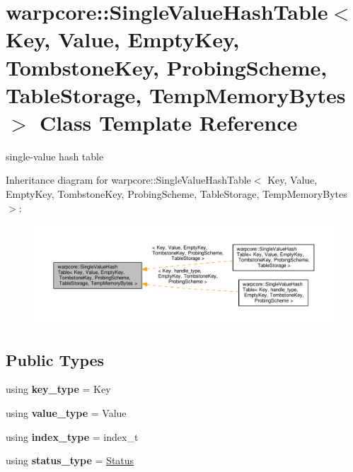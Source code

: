 \hypertarget{classwarpcore_1_1SingleValueHashTable}{}\section{warpcore\+:\+:Single\+Value\+Hash\+Table$<$ Key, Value, Empty\+Key, Tombstone\+Key, Probing\+Scheme, Table\+Storage, Temp\+Memory\+Bytes $>$ Class Template Reference}
\label{classwarpcore_1_1SingleValueHashTable}


single-\/value hash table  




Inheritance diagram for warpcore\+:\+:Single\+Value\+Hash\+Table$<$ Key, Value, Empty\+Key, Tombstone\+Key, Probing\+Scheme, Table\+Storage, Temp\+Memory\+Bytes $>$\+:
\nopagebreak
\begin{figure}[H]
\begin{center}
\leavevmode
\includegraphics[width=350pt]{classwarpcore_1_1SingleValueHashTable__inherit__graph}
\end{center}
\end{figure}
\subsection*{Public Types}
\begin{DoxyCompactItemize}
\item 
\mbox{\label{classwarpcore_1_1SingleValueHashTable_a7addf5255239ce3ceb7a14b5d327b727}} 
using {\bfseries key\+\_\+type} = Key
\item 
\mbox{\label{classwarpcore_1_1SingleValueHashTable_a73cd0226945becb4f8dd655d6e4d2102}} 
using {\bfseries value\+\_\+type} = Value
\item 
\mbox{\label{classwarpcore_1_1SingleValueHashTable_a998bad3c1c2f705752f9108e2a78a63f}} 
using {\bfseries index\+\_\+type} = index\+\_\+t
\item 
\mbox{\label{classwarpcore_1_1SingleValueHashTable_a4717a87387ac09ba343c1305ef73d55d}} 
using {\bfseries status\+\_\+type} = \hyperlink{classwarpcore_1_1Status}{Status}
\end{DoxyCompactItemize}
